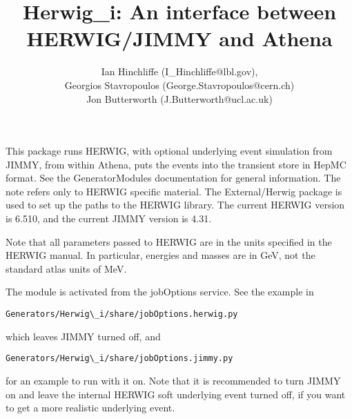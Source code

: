 \documentclass[11pt]{article}
\begin{document}
\title{Herwig\_i: An interface between HERWIG/JIMMY and Athena}
\author{ 
Ian Hinchliffe (I\_Hinchliffe@lbl.gov), \\
Georgios Stavropoulos (George.Stavropoulos@cern.ch) \\
Jon Butterworth (J.Butterworth@ucl.ac.uk)}

\maketitle       
 
\noindent
This package runs HERWIG, with optional underlying event simulation
from JIMMY, from within Athena, puts the events into the transient
store in HepMC format. See the GeneratorModules documentation for
general information. The note refers only to HERWIG specific
material. The External/Herwig package is used to set up the paths to
the HERWIG library. The current HERWIG version is 6.510, and the
current JIMMY version is 4.31.

Note that all parameters passed to HERWIG are in the units specified
in the HERWIG manual. In particular, energies and masses are in GeV,
not the standard atlas units of MeV. 

The module is activated from the jobOptions service. See the example in 
\begin{verbatim}
Generators/Herwig\_i/share/jobOptions.herwig.py
\end{verbatim}
which leaves JIMMY turned off, and 
\begin{verbatim}
Generators/Herwig\_i/share/jobOptions.jimmy.py
\end{verbatim}
for an example to run with it on. Note that it is recommended to turn
JIMMY on and leave the internal HERWIG soft underlying event turned
off, if you want to get a more realistic underlying event.
\end{document}
